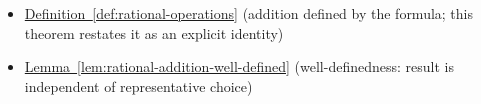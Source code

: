 \begin{dependencies}
\begin{itemize}
  \item \hyperref[def:rational-operations]{Definition~\ref*{def:rational-operations}}
        \textnormal{(addition defined by the formula; this theorem restates it as an explicit identity)}
  \item \hyperref[lem:rational-addition-well-defined]{Lemma~\ref*{lem:rational-addition-well-defined}}
        \textnormal{(well-definedness: result is independent of representative choice)}
\end{itemize}
\end{dependencies}